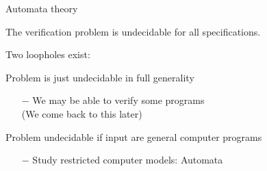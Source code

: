 \documentclass[../talk.tex]{subfiles}
\begin{document}
\begin{frame}{Automata theory}
    \begin{overlayarea}{\slidewidth}{\slideheight}
        \begin{theorem}
            The verification problem is undecidable for \alert{all} specifications.
        \end{theorem}

        \vspace*{1em}

        Two \alert{loopholes} exist:

        \begin{enumerate}
             Problem is just undecidable in full generality
                \begin{itemize}
                    \item[$-$] We may be able to verify \alert{some} programs
                        \\
                        (We come back to this later)
                \end{itemize}
             Problem undecidable if input are general computer programs
                \begin{itemize}
                    \item[$-$] Study restricted computer models: \alert{Automata}
                \end{itemize}
        \end{enumerate}
    \end{overlayarea}
\end{frame}
\end{document}
